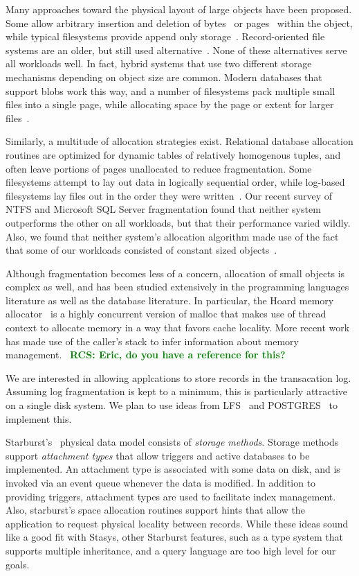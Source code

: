 \documentclass[letterpaper,twocolumn,10pt]{article}
\newcommand{\yad}{Stasys\xspace}
\newcommand{\rcs}[1]{\textcolor{green}{\bf RCS: #1}}
\begin{document}
Many approaches toward the physical layout of large objects have been
proposed.  Some allow arbitrary insertion and deletion of
bytes~\cite{esm} or pages~\cite{sqlserver} within the object, while
typical filesystems provide append only storage~\cite{ffs,ntfs}.
Record-oriented file systems are an older, but still used
alternative~\cite{multics,gfs}. None of these alternatives serve all
workloads well.  In fact, hybrid systems that use two different
storage mechanisms depending on object size are common.  Modern
databases that support blobs work this way, and a number of
filesystems pack multiple small files into a single page, while
allocating space by the page or extent for larger files~\cite{reiserfs3,didFFSdoThis}.

Similarly, a multitude of allocation strategies exist.  Relational
database allocation routines are optimized for dynamic tables of
relatively homogenous tuples, and often leave portions of pages
unallocated to reduce fragmentation.  Some filesystems attempt to lay
out data in logically sequential order, while log-based filesystems
lay files out in the order they were written~\cite{lfs}.  Our recent
survey of NTFS and Microsoft SQL Server fragmentation found that
neither system outperforms the other on all workloads, but that their
performance varied wildly.  Also, we found that neither system's
allocation algorithm made use of the fact that some of our workloads
consisted of constant sized objects~\cite{msrTechReport}.  



Although fragmentation becomes less of a concern, allocation of small
objects is complex as well, and has been studied extensively in the 
programming languages literature as well as the database literature.  In particular, the
Hoard memory allocator~\cite{hoard} is a highly concurrent version of
malloc that makes use of thread context to allocate memory in a way
that favors cache locality.  More recent work has
made use of the caller's stack to infer information about memory
management.~\cite{xxx} \rcs{Eric, do you have a reference for this?}

We are interested in allowing applcations to store records in
the transacation log.  Assuming log fragmentation is kept to a
minimum, this is particularly attractive on a single disk system.  We
plan to use ideas from LFS~\cite{lfs} and POSTGRES~\cite{postgres}
to implement this.

Starburst's~\cite{starburst} physical data model consists of {\em
  storage methods}.  Storage methods support {\em attachment types}
that allow triggers and active databases to be implemented.  An
attachment type is associated with some data on disk, and is invoked
via an event queue whenever the data is modified.  In addition to
providing triggers, attachment types are used to facilitate index
management.  Also, starburst's space allocation routines support hints
that allow the application to request physical locality between
records.  While these ideas sound like a good fit with \yad, other
Starburst features, such as a type system that supports multiple
inheritance, and a query language are too high level for our goals.
\end{document}
